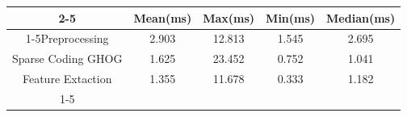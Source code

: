\documentclass{standalone}
\begin{document}
 
 \begin{tabular}{|c |c |c |c |c |}
\cline{2-5}\cline{2-5} \multicolumn{1}{c |}{ } & Mean(ms) & Max(ms) & Min(ms) & Median(ms)\\ 
\cline{1-5}Preprocessing & 2.903 & 12.813 & 1.545 & 2.695\\ 
 \hhline{|=|=|=|=|=|}Sparse Coding GHOG & 1.625 & 23.452 & 0.752 & 1.041\\ 
 \hhline{|=|=|=|=|=|}Feature Extaction & 1.355 & 11.678 & 0.333 & 1.182\\ 
 \cline{1-5}\hline \end{tabular}
 
\end{document}
